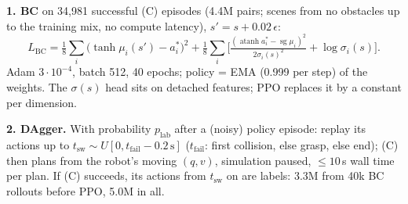 \documentclass[11pt]{article}
\newcommand{\sg}{\operatorname{sg}}
\begin{document}
\textbf{1. BC} on 34{,}981 successful (C) episodes (4.4M pairs; scenes from no obstacles up to the training mix, no compute latency), $s'=s+0.02\,\epsilon$:
\[
  L_{\text{BC}}=\tfrac18\textstyle\sum_i\big(\tanh\mu_i(s')-a^*_i\big)^2
  +\tfrac18\sum_i\Big[\tfrac{(\operatorname{atanh}a^*_i-\sg\mu_i)^2}{2\sigma_i(s)^2}+\log\sigma_i(s)\Big].
\]
Adam $3\cdot10^{-4}$, batch 512, 40 epochs; policy = EMA (0.999 per step) of the weights. The $\sigma(s)$ head sits on
detached features; PPO replaces it by a constant per dimension.

\textbf{2. DAgger.} With probability $p_{\text{lab}}$ after a (noisy) policy episode: replay its actions up to
$t_{\text{sw}}\sim U[0,t_{\text{fail}}-0.2\,\text{s}]$ ($t_{\text{fail}}$: first collision, else grasp, else end); (C)
then plans from the robot's moving $(q,v)$, simulation paused, $\le10$\,s wall time per plan. If (C) succeeds, its
actions from $t_{\text{sw}}$ on are labels: 3.3M from 40k BC rollouts before PPO, 5.0M in all.
\end{document}
